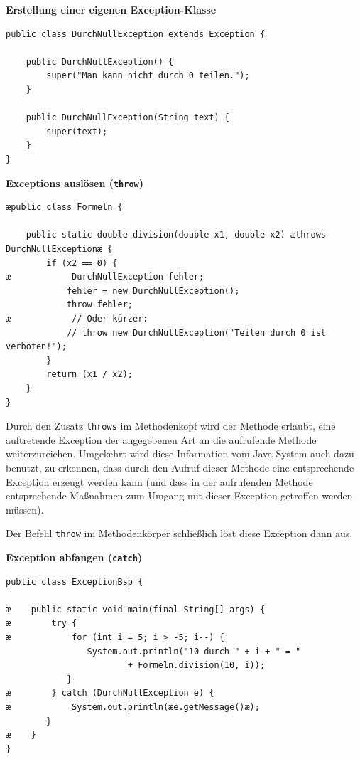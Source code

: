 \begin{compactenum}[a)]
\item \textbf{Erstellung einer eigenen Exception-Klasse}

\begin{lstlisting}
public class DurchNullException extends Exception {

    public DurchNullException() {
        super("Man kann nicht durch 0 teilen.");
    }

    public DurchNullException(String text) {
        super(text);
    }
}
\end{lstlisting}

\item \textbf{Exceptions auslösen (\texttt{throw})}

\begin{lstlisting}
æpublic class Formeln {

    public static double division(double x1, double x2) æthrows DurchNullExceptionæ { 
        if (x2 == 0) {
æ            DurchNullException fehler;
            fehler = new DurchNullException();
            throw fehler;
æ            // Oder kürzer:
            // throw new DurchNullException("Teilen durch 0 ist verboten!");
        }
        return (x1 / x2);
    }
}
\end{lstlisting}

Durch den Zusatz \lstinline|throws| im Methodenkopf wird der Methode erlaubt,
eine auftretende Exception der angegebenen Art an die aufrufende Methode
weiterzureichen. Umgekehrt wird diese Information vom Java-System auch dazu
benutzt, zu erkennen, dass durch den Aufruf dieser Methode eine entsprechende
Exception erzeugt werden kann (und dass in der aufrufenden Methode
entsprechende Maßnahmen zum Umgang mit dieser Exception getroffen werden
müssen).

Der Befehl \lstinline|throw| im Methodenkörper schließlich löst diese Exception
dann aus.

\item \textbf{Exception abfangen (\texttt{catch})}

\begin{lstlisting}
public class ExceptionBsp {

æ    public static void main(final String[] args) {
æ        try {
æ            for (int i = 5; i > -5; i--) {
                System.out.println("10 durch " + i + " = "
                        + Formeln.division(10, i));
            }
æ        } catch (DurchNullException e) {
æ            System.out.println(æe.getMessage()æ);
        }
æ    }
}
\end{lstlisting}


\end{compactenum}
